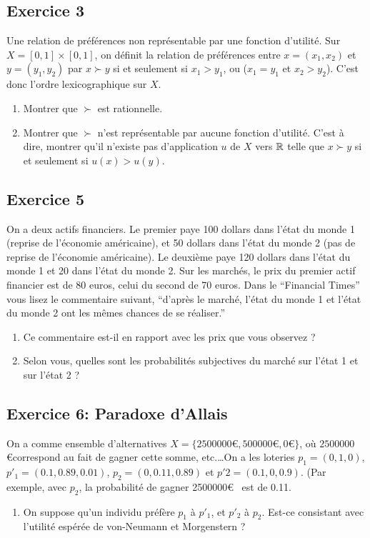 \subsection{Exercice 3}
Une relation de préférences non représentable par une fonction
d'utilité. Sur $X=[0,1]\times[0,1]$, on définit la relation de
préférences entre $x=(x_1,x_2)$ et $y=(y_1,y_2)$ par $x\succ y$ si
et seulement si $x_1> y_1$, ou ($x_1=y_1$ et $x_2>y_2$). C'est
donc l'ordre lexicographique sur $X$.
\begin{enumerate}
\item Montrer que $\succ$ est rationnelle.%
\item Montrer que $\succ$ n'est représentable par aucune fonction
d'utilité. C'est à dire, montrer qu'il n'existe pas d'application
$u$ de $X$ vers $\mathbb R$ telle que $x\succ y$ si et seulement si
$u(x)> u(y)$.
\end{enumerate}
\subsection{Exercice 5} On a deux actifs financiers. Le premier
paye 100 dollars dans l'état du monde 1 (reprise de l'économie
américaine), et 50 dollars dans l'état du monde 2 (pas de reprise
de l'économie américaine). Le deuxième paye 120 dollars dans
l'état du monde 1 et 20 dans l'état du monde 2. Sur les marchés,
le prix du premier actif financier est de $80$ euros, celui du
second de 70 euros. Dans le ``Financial Times'' vous lisez le
commentaire suivant, ``d'après le marché, l'état du monde 1 et
l'état du monde 2 ont les mêmes chances de se réaliser.''
\begin{enumerate}
\item Ce commentaire est-il en rapport avec les prix que vous
observez ? %
\item  Selon vous, quelles sont les probabilités subjectives du
marché sur l'état 1 et sur l'état 2 ? %
\end{enumerate}
\subsection{Exercice 6: Paradoxe d'Allais}
On a comme ensemble d'alternatives $X =\{ 2 500 000 $\euro$, 500
000 $\euro$, 0 $\euro$ \}$, où $2 500 000 $\euro correspond au
fait de gagner cette somme, etc.\ldots On a les loteries $p_1 =
(0,1,0)$,  $p'_1 = (0.1,0.89,0.01)$, $p_2 = (0,0.11,0.89)$ et $p'2
= (0.1,0,0.9)$. (Par exemple, avec $p_2$, la probabilité de gagner
2500000\euro~ est de 0.11.
\begin{enumerate}
\item On suppose qu'un individu préfère $p_1$ à $p'_1$, et $p'_2$ à $p_2$.
Est-ce consistant avec l'utilité espérée de von-Neumann et Morgenstern ?
\end{enumerate}
